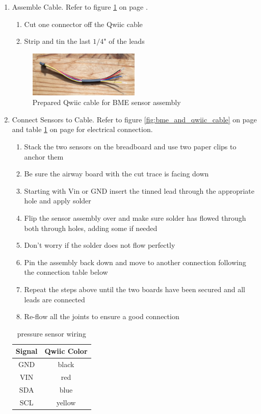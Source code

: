 \documentclass[11pt, letterpaper]{article}
\begin{document}
\begin{enumerate}
\begin{enumerate}[label=3.\arabic*]
\item
Assemble Cable. Refer to figure \ref{fig:bme_qwiic_cable} on page \pageref{fig:bme_qwiic_cable}.
\begin{enumerate}[label=3.3.\arabic*]
\item
Cut one connector off the Qwiic cable
\item
Strip and tin the last $1/4$" of the leads 
\end{enumerate}
\begin{figure}[H]
\centering
\includegraphics[width=0.5\textwidth]{images/bme_qwiic_cable.JPG}
\caption{Prepared Qwiic cable for BME sensor assembly} 
\label{fig:bme_qwiic_cable}
\end{figure}
\item
Connect Sensors to Cable. Refer to figure \ref{fig:bme_and_qwiic_cable} on page \pageref{fig:bme_and_qwiic_cable} and table \ref{tab:pressure} on page \pageref{tab:pressure} for electrical connection.
\begin{enumerate}[label=3.4.\arabic*]
\item
Stack the two sensors on the breadboard and use two paper clips to anchor them
\item
Be sure the airway board with the cut trace is facing down
\item
Starting with Vin or GND insert the tinned lead through the appropriate hole and apply solder
\item
Flip the sensor assembly over and make sure solder has flowed through both through holes, adding some if needed
\item
Don't worry if the solder does not flow perfectly
\item
Pin the assembly back down and move to another connection following the connection table below
\item
Repeat the steps above until the two boards have been secured and all leads are connected
\item
Re-flow all the joints to ensure a good connection
\end{enumerate}

\begin{table}[H]
\centering
\begin{tabular}{| c | c |}
\hline
Signal & Qwiic Color\\  \hline
GND & black  \\  \hline
VIN & red \\  \hline
SDA & blue \\  \hline
SCL & yellow \\  
\hline
\end{tabular}
\caption{pressure sensor wiring}
\label{tab:pressure}
\end{table}


\end{enumerate}
\end{enumerate}
\end{document}
